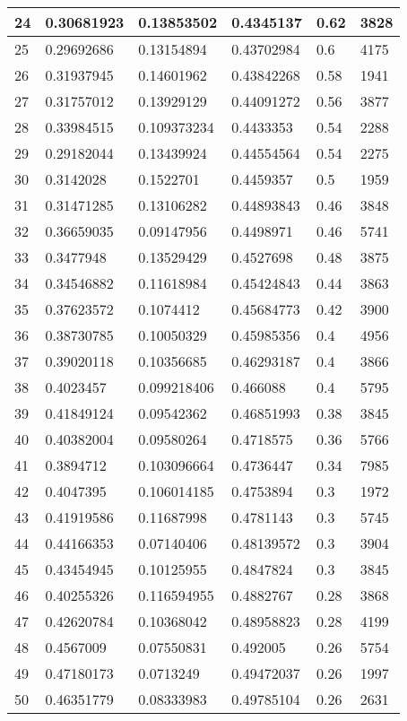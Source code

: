 \begin{longtable}{|l|l|l|l|l|l|}
24 & 0.30681923 & 0.13853502 & 0.4345137 & 0.62 & 3828 \\ \hline 
25 & 0.29692686 & 0.13154894 & 0.43702984 & 0.6 & 4175 \\ \hline 
26 & 0.31937945 & 0.14601962 & 0.43842268 & 0.58 & 1941 \\ \hline 
27 & 0.31757012 & 0.13929129 & 0.44091272 & 0.56 & 3877 \\ \hline 
28 & 0.33984515 & 0.109373234 & 0.4433353 & 0.54 & 2288 \\ \hline 
29 & 0.29182044 & 0.13439924 & 0.44554564 & 0.54 & 2275 \\ \hline 
30 & 0.3142028 & 0.1522701 & 0.4459357 & 0.5 & 1959 \\ \hline 
31 & 0.31471285 & 0.13106282 & 0.44893843 & 0.46 & 3848 \\ \hline 
32 & 0.36659035 & 0.09147956 & 0.4498971 & 0.46 & 5741 \\ \hline 
33 & 0.3477948 & 0.13529429 & 0.4527698 & 0.48 & 3875 \\ \hline 
34 & 0.34546882 & 0.11618984 & 0.45424843 & 0.44 & 3863 \\ \hline 
35 & 0.37623572 & 0.1074412 & 0.45684773 & 0.42 & 3900 \\ \hline 
36 & 0.38730785 & 0.10050329 & 0.45985356 & 0.4 & 4956 \\ \hline 
37 & 0.39020118 & 0.10356685 & 0.46293187 & 0.4 & 3866 \\ \hline 
38 & 0.4023457 & 0.099218406 & 0.466088 & 0.4 & 5795 \\ \hline 
39 & 0.41849124 & 0.09542362 & 0.46851993 & 0.38 & 3845 \\ \hline 
40 & 0.40382004 & 0.09580264 & 0.4718575 & 0.36 & 5766 \\ \hline 
41 & 0.3894712 & 0.103096664 & 0.4736447 & 0.34 & 7985 \\ \hline 
42 & 0.4047395 & 0.106014185 & 0.4753894 & 0.3 & 1972 \\ \hline 
43 & 0.41919586 & 0.11687998 & 0.4781143 & 0.3 & 5745 \\ \hline 
44 & 0.44166353 & 0.07140406 & 0.48139572 & 0.3 & 3904 \\ \hline 
45 & 0.43454945 & 0.10125955 & 0.4847824 & 0.3 & 3845 \\ \hline 
46 & 0.40255326 & 0.116594955 & 0.4882767 & 0.28 & 3868 \\ \hline 
47 & 0.42620784 & 0.10368042 & 0.48958823 & 0.28 & 4199 \\ \hline 
48 & 0.4567009 & 0.07550831 & 0.492005 & 0.26 & 5754 \\ \hline 
49 & 0.47180173 & 0.0713249 & 0.49472037 & 0.26 & 1997 \\ \hline 
50 & 0.46351779 & 0.08333983 & 0.49785104 & 0.26 & 2631 \\ \hline 
\end{longtable}